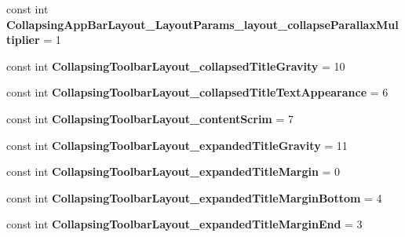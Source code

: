 \begin{DoxyCompactItemize}
\item 
\hypertarget{classClient_1_1Droid_1_1Resource_1_1Styleable_a9066f384fef351b28639d93d69a9b640}{}const int {\bfseries Collapsing\+App\+Bar\+Layout\+\_\+\+Layout\+Params\+\_\+layout\+\_\+collapse\+Parallax\+Multiplier} = 1\label{classClient_1_1Droid_1_1Resource_1_1Styleable_a9066f384fef351b28639d93d69a9b640}

\item 
\hypertarget{classClient_1_1Droid_1_1Resource_1_1Styleable_a3ab387c0bd401b72f0d7d503843c4494}{}const int {\bfseries Collapsing\+Toolbar\+Layout\+\_\+collapsed\+Title\+Gravity} = 10\label{classClient_1_1Droid_1_1Resource_1_1Styleable_a3ab387c0bd401b72f0d7d503843c4494}

\item 
\hypertarget{classClient_1_1Droid_1_1Resource_1_1Styleable_af8cfb820a7b9a4d684ff6275b09124c2}{}const int {\bfseries Collapsing\+Toolbar\+Layout\+\_\+collapsed\+Title\+Text\+Appearance} = 6\label{classClient_1_1Droid_1_1Resource_1_1Styleable_af8cfb820a7b9a4d684ff6275b09124c2}

\item 
\hypertarget{classClient_1_1Droid_1_1Resource_1_1Styleable_ad5ec16c7f706840aa1fabb1c11b6cf32}{}const int {\bfseries Collapsing\+Toolbar\+Layout\+\_\+content\+Scrim} = 7\label{classClient_1_1Droid_1_1Resource_1_1Styleable_ad5ec16c7f706840aa1fabb1c11b6cf32}

\item 
\hypertarget{classClient_1_1Droid_1_1Resource_1_1Styleable_af44fac689e226904b6ea0eed0772189a}{}const int {\bfseries Collapsing\+Toolbar\+Layout\+\_\+expanded\+Title\+Gravity} = 11\label{classClient_1_1Droid_1_1Resource_1_1Styleable_af44fac689e226904b6ea0eed0772189a}

\item 
\hypertarget{classClient_1_1Droid_1_1Resource_1_1Styleable_aaefbb7c8876197dfb6d22bdb29c01b5e}{}const int {\bfseries Collapsing\+Toolbar\+Layout\+\_\+expanded\+Title\+Margin} = 0\label{classClient_1_1Droid_1_1Resource_1_1Styleable_aaefbb7c8876197dfb6d22bdb29c01b5e}

\item 
\hypertarget{classClient_1_1Droid_1_1Resource_1_1Styleable_a192db0f67cb24f9b1b8c052f3e70e3cd}{}const int {\bfseries Collapsing\+Toolbar\+Layout\+\_\+expanded\+Title\+Margin\+Bottom} = 4\label{classClient_1_1Droid_1_1Resource_1_1Styleable_a192db0f67cb24f9b1b8c052f3e70e3cd}

\item 
\hypertarget{classClient_1_1Droid_1_1Resource_1_1Styleable_a35a7c06f34205c5be1180cc851016db8}{}const int {\bfseries Collapsing\+Toolbar\+Layout\+\_\+expanded\+Title\+Margin\+End} = 3\label{classClient_1_1Droid_1_1Resource_1_1Styleable_a35a7c06f34205c5be1180cc851016db8}


\end{DoxyCompactItemize}
